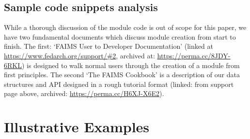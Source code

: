 \documentclass[preprint,12pt, a4paper]{elsarticle}
\begin{document}
\subsection{Sample code snippets analysis}
\label{}

While a thorough discussion of the module code is out of scope for this paper, we have two fundamental documents which discuss module creation from start to finish. The first: `FAIMS User to Developer Documentation' (linked at \url{https://www.fedarch.org/support/\#2}, archived at: \url{https://perma.cc/8JDY-6RKL}) is designed to walk normal users through the creation of a module from first principles. The second `The FAIMS Cookbook' is a description of our data structures and API designed in a rough tutorial format (linked: from support page above, archived: \url{https://perma.cc/H6XJ-X6E2}).

\section{Illustrative Examples}
\label{}
\end{document}
